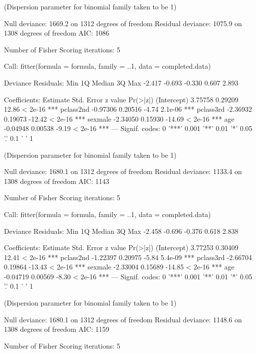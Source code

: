 \begin{Schunk}
\begin{Soutput}
(Dispersion parameter for binomial family taken to be 1)

    Null deviance: 1669.2  on 1312  degrees of freedom
Residual deviance: 1075.9  on 1308  degrees of freedom
AIC: 1086

Number of Fisher Scoring iterations: 5


Call:
fitter(formula = formula, family = ..1, data = completed.data)

Deviance Residuals: 
   Min      1Q  Median      3Q     Max  
-2.417  -0.693  -0.330   0.607   2.893  

Coefficients:
            Estimate Std. Error z value Pr(>|z|)    
(Intercept)  3.75758    0.29209   12.86  < 2e-16 ***
pclass2nd   -0.97306    0.20516   -4.74  2.1e-06 ***
pclass3rd   -2.36932    0.19073  -12.42  < 2e-16 ***
sexmale     -2.34050    0.15930  -14.69  < 2e-16 ***
age         -0.04948    0.00538   -9.19  < 2e-16 ***
---
Signif. codes:  0 '***' 0.001 '**' 0.01 '*' 0.05 '.' 0.1 ' ' 1

(Dispersion parameter for binomial family taken to be 1)

    Null deviance: 1680.1  on 1312  degrees of freedom
Residual deviance: 1133.4  on 1308  degrees of freedom
AIC: 1143

Number of Fisher Scoring iterations: 5


Call:
fitter(formula = formula, family = ..1, data = completed.data)

Deviance Residuals: 
   Min      1Q  Median      3Q     Max  
-2.458  -0.696  -0.376   0.618   2.838  

Coefficients:
            Estimate Std. Error z value Pr(>|z|)    
(Intercept)  3.77253    0.30409   12.41  < 2e-16 ***
pclass2nd   -1.22397    0.20975   -5.84  5.4e-09 ***
pclass3rd   -2.66704    0.19864  -13.43  < 2e-16 ***
sexmale     -2.33004    0.15689  -14.85  < 2e-16 ***
age         -0.04719    0.00569   -8.30  < 2e-16 ***
---
Signif. codes:  0 '***' 0.001 '**' 0.01 '*' 0.05 '.' 0.1 ' ' 1

(Dispersion parameter for binomial family taken to be 1)

    Null deviance: 1680.1  on 1312  degrees of freedom
Residual deviance: 1148.6  on 1308  degrees of freedom
AIC: 1159

Number of Fisher Scoring iterations: 5
\end{Soutput}
\end{Schunk}
